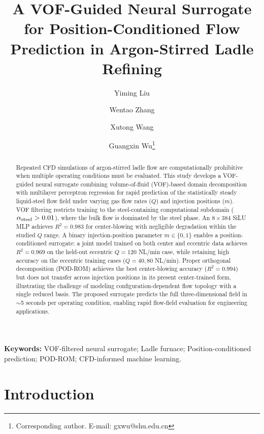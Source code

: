 \documentclass[12pt,a4paper]{article}
\begin{document}
\title{\bfseries A VOF-Guided Neural Surrogate for Position-Conditioned Flow Prediction in Argon-Stirred Ladle Refining}

\author[1]{Yiming Liu}
\author[1]{Wentao Zhang}
\author[1]{Xutong Wang}
\author[1]{Guangxin Wu\thanks{Corresponding author. E-mail: gxwu@shu.edu.cn}}

\maketitle

\begin{abstract}
Repeated CFD simulations of argon-stirred ladle flow are computationally prohibitive when multiple operating conditions must be evaluated. This study develops a VOF-guided neural surrogate combining volume-of-fluid (VOF)-based domain decomposition with multilayer perceptron regression for rapid prediction of the statistically steady liquid-steel flow field under varying gas flow rates ($Q$) and injection positions ($m$). VOF filtering restricts training to the steel-containing computational subdomain ($\alpha_{\rm steel}>0.01$), where the bulk flow is dominated by the steel phase. An $8\times384$ SiLU MLP achieves $R^{2}=0.983$ for center-blowing with negligible degradation within the studied $Q$ range. A binary injection-position parameter $m\in\{0,1\}$ enables a position-conditioned surrogate: a joint model trained on both center and eccentric data achieves $R^{2}=0.969$ on the held-out eccentric $Q=120$ NL/min case, while retaining high accuracy on the eccentric training cases ($Q=40,80$ NL/min). Proper orthogonal decomposition (POD-ROM) achieves the best center-blowing accuracy ($R^{2}=0.994$) but does not transfer across injection positions in its present center-trained form, illustrating the challenge of modeling configuration-dependent flow topology with a single reduced basis. The proposed surrogate predicts the full three-dimensional field in $\sim$5 seconds per operating condition, enabling rapid flow-field evaluation for engineering applications.
\end{abstract}

\bigskip
\noindent\textbf{Keywords:} VOF-filtered neural surrogate; Ladle furnace; Position-conditioned prediction; POD-ROM; CFD-informed machine learning.

\section{Introduction}
\end{document}
